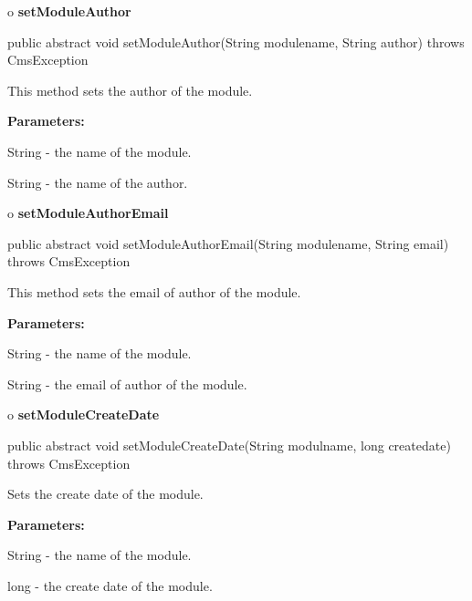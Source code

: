 o {\bf setModuleAuthor} 

\begin{PRE}
 public abstract void setModuleAuthor(String modulename,
                                      String author) throws CmsException
\end{PRE}

\begin{description}
\htmlDD This method sets the author of the module. 

\begin{description}
\item {\bf Parameters:}  

String - the name of the module.  

String - the name of the author.  
\end{description}

\end{description}

o {\bf setModuleAuthorEmail} 

\begin{PRE}
 public abstract void setModuleAuthorEmail(String modulename,
                                           String email) throws CmsException
\end{PRE}

\begin{description}
\htmlDD This method sets the email of author of the module. 

\begin{description}
\item {\bf Parameters:}  

String - the name of the module.  

String - the email of author of the module.  
\end{description}

\end{description}

o {\bf setModuleCreateDate} 

\begin{PRE}
 public abstract void setModuleCreateDate(String modulname,
                                          long createdate) throws CmsException
\end{PRE}

\begin{description}
\htmlDD Sets the create date of the module. 

\begin{description}
\item {\bf Parameters:}  

String - the name of the module.  

long - the create date of the module.  
\end{description}

\end{description}

